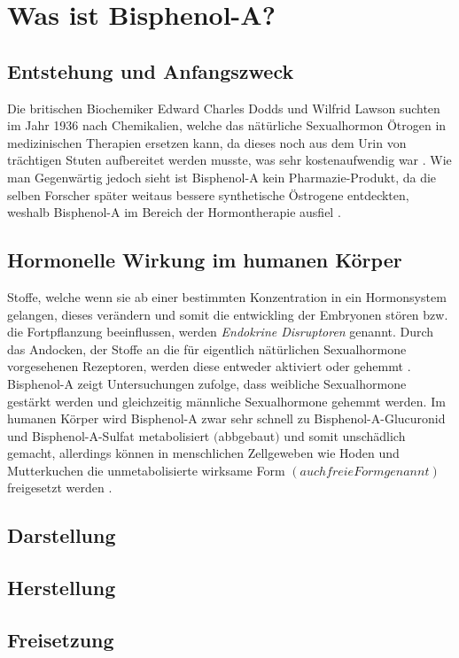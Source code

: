 \section{Was ist Bisphenol-A?}
\subsection{Entstehung und Anfangszweck}
Die britischen Biochemiker Edward Charles Dodds und Wilfrid Lawson suchten 
im Jahr 1936 nach Chemikalien, welche das nätürliche Sexualhormon Ötrogen in medizinischen 
Therapien ersetzen kann, da dieses noch aus dem Urin von trächtigen Stuten 
aufbereitet werden musste, was sehr kostenaufwendig war \cite[]{Umweltbundesamt2010}. 
Wie man Gegenwärtig jedoch sieht ist Bisphenol-A kein Pharmazie-Produkt, da die selben Forscher
später weitaus bessere synthetische Östrogene entdeckten, weshalb Bisphenol-A im Bereich
der Hormontherapie ausfiel \cite{Wikipedia}. 

\subsection{Hormonelle Wirkung im humanen Körper}
Stoffe, welche wenn sie ab einer bestimmten Konzentration in ein Hormonsystem gelangen,
dieses verändern und somit die entwickling der Embryonen stören bzw. die Fortpflanzung
beeinflussen, werden \textit{Endokrine Disruptoren} genannt.
Durch das Andocken, der Stoffe an die für eigentlich nätürlichen Sexualhormone 
vorgesehenen Rezeptoren, werden diese entweder aktiviert oder gehemmt \cite{Umweltbundesamt2010}.
Bisphenol-A zeigt Untersuchungen zufolge, dass weibliche Sexualhormone gestärkt werden und 
gleichzeitig männliche Sexualhormone gehemmt werden.
Im humanen Körper wird Bisphenol-A zwar sehr schnell zu Bisphenol-A-Glucuronid und 
Bisphenol-A-Sulfat metabolisiert $($abbgebaut$)$ und somit unschädlich gemacht, allerdings
können in menschlichen Zellgeweben wie Hoden und Mutterkuchen die unmetabolisierte wirksame
Form $(auch freie Form genannt)$ freigesetzt werden \cite{Umweltbundesamt2010}.

\subsection{Darstellung}
\subsection{Herstellung}
\subsection{Freisetzung}
